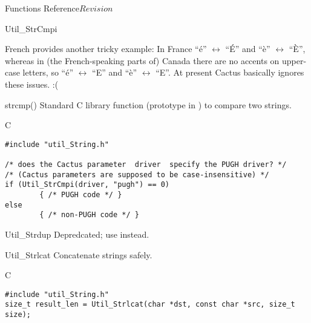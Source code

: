 \begin{cactuspart}{ Functions Reference}{}{$Revision$}
\begin{FunctionDescription}{Util\_StrCmpi}
\begin{Discussion}
{	 French provides another tricky example:
	 In France ``\'e'' $\leftrightarrow$ ``\'E'' and
	 ``\`e'' $\leftrightarrow$ ``\`E'',
	 whereas in (the French-speaking parts of) Canada
	 there are no accents on upper-case letters, so
	 ``\'e'' $\leftrightarrow$ ``E'' and
	 ``\`e'' $\leftrightarrow$ ``E''.
	 }%
{}  At present Cactus basically ignores these issues. :(
\end{Discussion}

\begin{SeeAlsoSection}
\begin{SeeAlso}{strcmp()}
Standard C library function (prototype in )
to compare two strings.
\end{SeeAlso}
\end{SeeAlsoSection}

\begin{ExampleSection}
\begin{Example}{C}
\begin{verbatim}
#include "util_String.h"

/* does the Cactus parameter  driver  specify the PUGH driver? */
/* (Cactus parameters are supposed to be case-insensitive) */
if (Util_StrCmpi(driver, "pugh") == 0)
        { /* PUGH code */ }
else
        { /* non-PUGH code */ }
\end{verbatim}
\end{Example}
\end{ExampleSection}
\end{FunctionDescription}


\begin{FunctionDescription}{Util\_Strdup}
\label{Util-Strdup}
Depredcated; use  instead.
\end{FunctionDescription}


\begin{FunctionDescription}{Util\_Strlcat}
\label{Util-Strlcat}
Concatenate strings safely.

\begin{SynopsisSection}
\begin{Synopsis}{C}
\begin{verbatim}
#include "util_String.h"
size_t result_len = Util_Strlcat(char *dst, const char *src, size_t size);
\end{verbatim}
\end{Synopsis}
\end{SynopsisSection}


\end{FunctionDescription}
\end{cactuspart}
